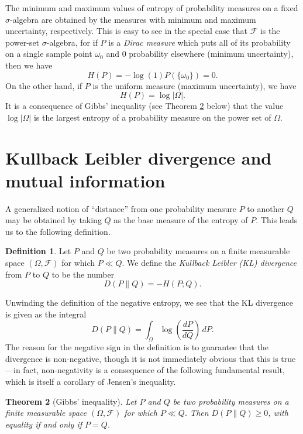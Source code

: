 \documentclass[11pt]{book}
\newtheorem{thm}{Theorem}[section]
\theoremstyle{definition}
\newtheorem{defn}[thm]{Definition}
\numberwithin{equation}{section}
\begin{document}
The minimum and maximum values of entropy of probability measures on a fixed $\sigma$-algebra are obtained by the measures with minimum and maximum uncertainty, respectively. This is easy to see in the special case that $\mathcal{F}$ is the power-set $\sigma$-algebra, for if $P$ is a \textit{Dirac measure} which puts all of its probability on a single sample point $\omega_0$ and $0$ probability elsewhere (minimum uncertainty), then we have
\[
	H(P) = - \log{\left(1\right)}P(\{\omega_0\})=0.
\]
On the other hand, if $P$ is the uniform measure (maximum uncertainty), we have
\[
	H(P) = \log{|\Omega|}.
\]
It is a consequence of Gibbs' inequality (see Theorem \ref{thm:gibbs} below) that the value $\log{|\Omega|}$ is the largest entropy of a probability measure on the power set of $\Omega$.

\section{Kullback Leibler divergence and mutual information}

A generalized notion of ``distance'' from one probability measure $P$ to another $Q$ may be obtained by taking $Q$ as the base measure of the entropy of $P$. This leads us to the following definition.

\begin{defn}
	Let $P$ and $Q$ be two probability measures on a finite measurable space $(\Omega, \mathcal{F})$ for which $P \ll Q$. We define the \textit{Kullback Leibler (KL) divergence} from $P$ to $Q$ to be the number
	\[
		D(P \parallel Q) = - H(P ; Q).
	\]
\end{defn}

Unwinding the definition of the negative entropy, we see that the KL divergence is given as the integral
\[
	D(P \parallel Q) = \int_\Omega \log { \left( \frac{dP}{dQ} \right)} \, dP.
\]
The reason for the negative sign in the definition is to guarantee that the divergence is non-negative, though it is not immediately obvious that this is true---in fact, non-negativity is a consequence of the following fundamental result, which is itself a corollary of Jensen's inequality.

\begin{thm}[Gibbs' inequality]\label{thm:gibbs}
	Let $P$ and $Q$ be two probability measures on a finite measurable space $(\Omega, \mathcal{F})$ for which $P \ll Q$. Then $D(P \parallel Q) \geq 0$, with equality if and only if $P=Q$.
\end{thm}
\end{document}
